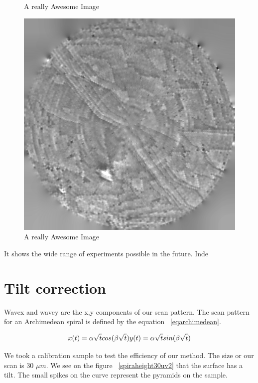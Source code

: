 \begin{figure}[!ht]
  \caption{A really Awesome Image}\label{fig:cd5}
\endminipage\hfill
{}%
  \includegraphics[width=\linewidth]{images/006_X10s50l10m_MOv2_1007.png}
  \caption{A really Awesome Image}\label{fig:cd6}
\endminipage
\end{figure}

It shows the wide range of experiments possible in the future. Inde

\section{Tilt correction}

Wavex and wavey are the x,y components of our scan pattern. The scan pattern for an Archimedean spiral is defined by the equation  ~\ref{eqarchimedean}.

\begin{equation}\label{eqarchimedean}
x(t)= \alpha \sqrt{t} cos(\beta \sqrt{t})\\
y(t)= \alpha \sqrt{t} sin(\beta \sqrt{t})
\end{equation}

We took a calibration sample to test the efficiency of our method. The size or our scan is 30 $\mu m$. We see on the figure  ~\ref{spiraheight30uv2} that the surface has a tilt. The small spikes on the curve represent the pyramids on the sample.

